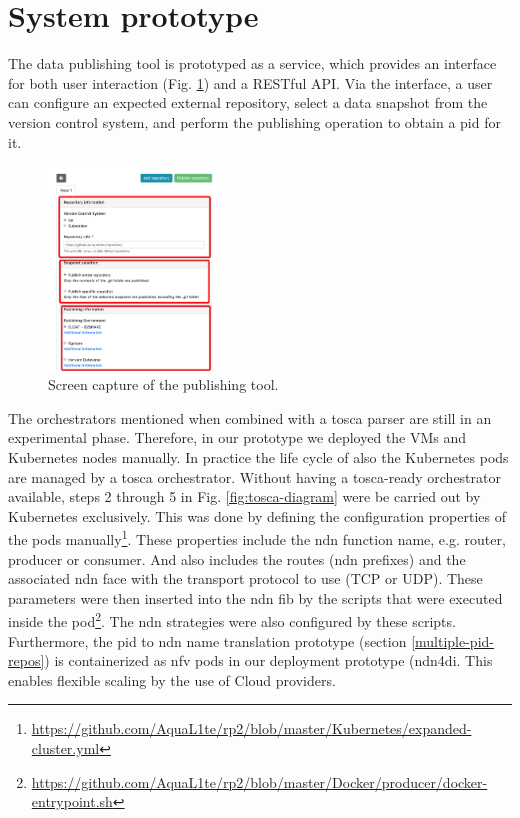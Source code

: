 \documentclass[conference]{IEEEtran}
\begin{document}
\section{System prototype}
\label{ndn-planning-deployment}
The data publishing tool is prototyped as a service, which provides an interface for both user interaction (Fig. \ref{fig:publishingagent}) and a RESTful API. Via the interface, a user can configure an expected external repository, select a data snapshot from the version control system, and perform the publishing operation to obtain a \gls{pid} for it.

\begin{figure}
\centering
\includegraphics[width=0.4\textwidth]{images/publishingagent.png}
\caption{Screen capture of the publishing tool.}
\label{fig:publishingagent}
\end{figure}

The orchestrators mentioned when combined with a \gls{tosca} parser are still in an experimental phase. Therefore, in our prototype we deployed the VMs and Kubernetes nodes manually. In practice the life cycle of also the Kubernetes pods are managed by a \gls{tosca} orchestrator. Without having a \gls{tosca}-ready orchestrator available, steps 2 through 5 in Fig. \ref{fig:tosca-diagram} were be carried out by Kubernetes exclusively. This was done by defining the configuration properties of the pods manually\footnote{\url{https://github.com/AquaL1te/rp2/blob/master/Kubernetes/expanded-cluster.yml}}. These properties include the \gls{ndn} function name, e.g. router, producer or consumer. And also includes the routes (\gls{ndn} prefixes) and the associated \gls{ndn} face with the transport protocol to use (TCP or UDP). These parameters were then inserted into the \gls{ndn} \gls{fib} by the scripts that were executed inside the pod\footnote{\url{https://github.com/AquaL1te/rp2/blob/master/Docker/producer/docker-entrypoint.sh}}. The \gls{ndn} strategies were also configured by these scripts. Furthermore, the \gls{pid} to \gls{ndn} name translation prototype (section \ref{multiple-pid-repos}) is containerized as \gls{nfv} pods in our deployment prototype (\gls{ndn4di}. This enables flexible scaling by the use of Cloud providers.
\end{document}
